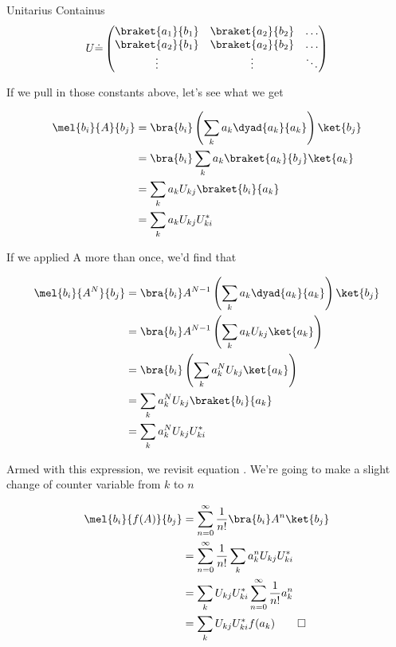 \begin{answer}
\begin{answerpart}{Unitarius Containus}
  \begin{equation}
    U \dot{=}
    \begin{pmatrix}
      \braket{a_1}{b_1} & \braket{a_2}{b_2} & \ldots\\
      \braket{a_2}{b_1} & \braket{a_2}{b_2} & \ldots\\
      \vdots & \vdots & \ddots\\
    \end{pmatrix}
  \end{equation}

  If we pull in those constants above, let's see what we get
  
  \begin{equation}
    \begin{alignedat}{2}
      &&\mel{b_i}{A}{b_j}
      &= \bra{b_i}\left(\sum_k a_k\dyad{a_k}{a_k}\right)\ket{b_j}\\
      &&&= \bra{b_i}\sum_k a_k\braket{a_k}{b_j}\ket{a_k}\\
      &&&= \sum_k a_kU_{kj}\braket{b_i}{a_k}\\
      &&&= \sum_k a_kU_{kj}U_{ki}^{*}\\
    \end{alignedat}
  \end{equation}

  If we applied A more than once, we'd find that
  
  \begin{equation}
    \begin{alignedat}{2}
      &&\mel{b_i}{A^N}{b_j}
      &= \bra{b_i}A^{N-1}\left(\sum_k a_k\dyad{a_k}{a_k}\right)\ket{b_j}\\
      &&&= \bra{b_i}A^{N-1}\left(\sum_k a_kU_{kj}\ket{a_k}\right)\\
      &&&= \bra{b_i}\left(\sum_k a_k^N U_{kj}\ket{a_k}\right)\\
      &&&= \sum_k a_k^N U_{kj}\braket{b_i}{a_k}\\
      &&&= \sum_k a_k^N U_{kj}U_{ki}^{*}\\
    \end{alignedat}
  \end{equation}

  Armed with this expression, we revisit equation .
  We're going to make a slight change of counter variable from $k$ to
  $n$

  \begin{equation}
    \begin{alignedat}{2}
      &&\mel{b_i}{f(A)}{b_j}
      &=
      \sum_{n=0}^{\infty} \frac{1}{n!} \bra{b_i} A^n \ket{b_j}
      \\
      &&&=
      \sum_{n=0}^{\infty} \frac{1}{n!} \sum_k a_k^n U_{kj}U_{ki}^{*}
      \\
      &&&=
      \sum_k U_{kj}U_{ki}^{*} \sum_{n=0}^{\infty} \frac{1}{n!}a_k^n
      \\
      &&&=
      \sum_k U_{kj}U_{ki}^{*}f(a_k)\qed
      \\
    \end{alignedat}
  \end{equation}


\end{answerpart}
\end{answer}
